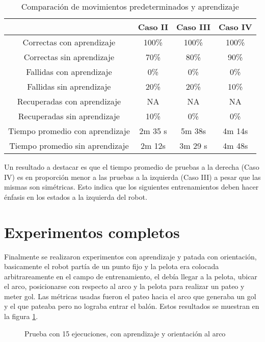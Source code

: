 \begin{table}
\centering
\begin{tabular}{c c c c}
\hline 
 & Caso II & Caso III & Caso IV \\ 
\hline 
Correctas con aprendizaje & 100\% & 100\% & 100\% \\ 
Correctas sin aprendizaje & 70\% & 80\% & 90\% \\ 
Fallidas con aprendizaje & 0\% & 0\% & 0\% \\ 
Fallidas sin aprendizaje & 20\% & 20\% & 10\% \\ 
Recuperadas con aprendizaje & NA & NA & NA \\ 
Recuperadas sin aprendizaje & 10\% & 0\% & 0\% \\ 
Tiempo promedio con aprendizaje & 2m 35 s & 5m 38s & 4m 14s \\ 
Tiempo promedio sin aprendizaje & 2m 12s & 3m 29 s & 4m 48s \\
\hline
\end{tabular} 
\caption{Comparaci\'on de movimientos predeterminados y aprendizaje}
\label{tabla:comparacion}

\end{table}

 Un resultado a destacar es que el tiempo promedio de pruebas a la derecha (Caso IV) es en proporci\'on  menor a las pruebas a la izquierda (Caso III) a pesar que las mismas son sim\'etricas. Esto indica que los siguientes entrenamientos deben hacer \'enfasis en los estados a la izquierda del robot.
 
\section{Experimentos completos} \label{completos}

Finalmente se realizaron experimentos con aprendizaje y patada con orientaci\'on, basicamente el robot part\'ia de un punto fijo y la pelota era colocada arbitrareamente en el campo de entrenamiento, el deb\'ia llegar a la pelota, ubicar el arco, posicionarse con respecto al arco y la pelota para realizar un pateo y meter gol.
Las m\'etricas usadas fueron el pateo hacia el arco que generaba un gol y el que pateaba pero no lograba entrar el bal\'on. Estos resultados se muestran en la figura \ref{fig:orientacion}.


\begin{figure}[h]
\centering
{}
\caption{Prueba con 15 ejecuciones, con aprendizaje y orientaci\'on al arco }
\label{fig:orientacion}
\end{figure} 

